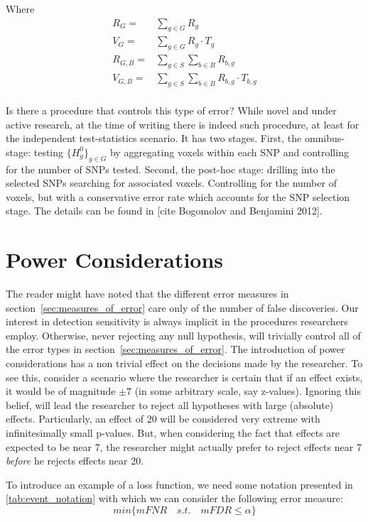 \documentclass[draft,12pt]{article}
\begin{document}
Where 
\begin{align*} 
   R_G = {}& \sum_{g \in G} R_g \\
   V_G = {}& \sum_{g \in G} R_g \cdot T_g \\
   R_{G,B} = {}& \sum_{g \in S} \sum_{b \in B} R_{b,g}\\
   V_{G,B} = {}& \sum_{g \in S} \sum_{b \in B} R_{b,g} \cdot T_{b,g}  \\
\end{align*}

Is there a procedure that controls this type of error? While novel and under active research, at the time of writing there is indeed such procedure, at least for the independent test-statistics scenario. It has two stages. 
First, the omnibus-stage:  testing $\{H^0_{g}\}_{g \in G}$ by aggregating voxels within each SNP and controlling for the number of SNPs tested. Second, the post-hoc stage: drilling into the selected SNPs searching for associated voxels. Controlling for the number of voxels, but with a conservative error rate which accounts for the SNP selection stage. 
The details can be found in [cite Bogomolov and Benjamini 2012].




\section{Power Considerations}
The reader might have noted that the different error measures in section~\ref{sec:measures_of_error} care only of the number of false discoveries. Our interest in detection sensitivity is always implicit in the procedures researchers employ. Otherwise, never rejecting any null hypothesis, will trivially control all of the error types in section~\ref{sec:measures_of_error}. 
The introduction of power considerations has a non trivial effect on the decisions made by the researcher. To see this, consider a scenario where the researcher is certain that if an effect exists, it would be of magnitude $\pm7$ (in some   arbitrary scale, say z-values). Ignoring this belief, will lead the researcher to reject all hypotheses with large (absolute) effects. Particularly, an effect of 20 will be considered very extreme with infinitesimally small p-values. But, when considering the fact that effects are expected to be near 7, the researcher might actually prefer to reject effects near 7 \emph{before} he rejects effects near 20.

To introduce an example of a loss function, we need some notation presented in \ref{tab:event_notation} with which we can consider the following error measure:
\begin{equation} \label{eq:compound_error}
min\{mFNR \quad s.t. \quad mFDR\leq \alpha \}
\end{equation}
\end{document}
